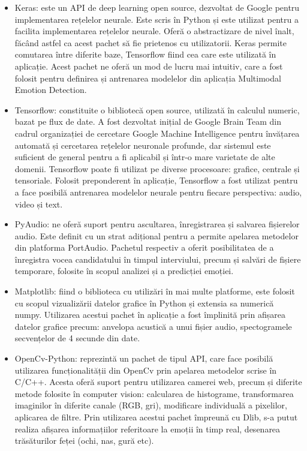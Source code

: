 \documentclass[a4paper, 12pt]{report}
\begin{document}
	\begin{itemize}
	 	\item Keras: este un API de deep learning open source, dezvoltat de Google pentru implementarea rețelelor neurale. Este scris în Python și este utilizat pentru a facilita implementarea rețelelor neurale. Oferă o abstractizare de nivel înalt, făcând astfel ca acest pachet să fie prietenos cu utilizatorii. Keras permite comutarea între diferite baze, Tensorflow fiind cea care este utilizată în aplicație. Acest pachet ne oferă un mod de lucru mai intuitiv, care a fost folosit pentru definirea și antrenarea modelelor din aplicația Multimodal Emotion Detection.
	
		\item Tensorflow: constituite o bibliotecă open source, utilizată în calculul numeric, bazat pe flux de date. A fost dezvoltat inițial de Google Brain Team din cadrul organizației de cercetare Google Machine Intelligence pentru învățarea automată și cercetarea rețelelor neuronale profunde, dar sistemul este suficient de general pentru a fi aplicabil și într-o mare varietate de alte domenii. Tensorflow poate fi utilizat pe diverse procesoare: grafice, centrale și tensoriale. Folosit preponderent în aplicație, Tensorflow a fost utilizat pentru a face posibilă antrenarea modelelor neurale pentru fiecare perspectiva: audio, video și text.
	
		\item PyAudio: ne oferă suport pentru ascultarea, înregistrarea și salvarea fișierelor audio. Este definit cu un strat adițional pentru a permite apelarea metodelor din platforma PortAudio. Pachetul respectiv a oferit posibilitatea de a înregistra vocea candidatului în timpul interviului, precum și salvări de fișiere temporare, folosite în scopul analizei și a predicției emoției.
	
		\item Matplotlib: fiind o biblioteca cu utilizări în mai multe platforme, este folosit cu scopul vizualizării datelor grafice în Python și extensia sa numerică numpy. Utilizarea acestui pachet în aplicație a fost împlinită prin afișarea datelor grafice precum: anvelopa acustică a unui fișier audio, spectogramele secvențelor de 4 secunde din date.
	
		\item OpenCv-Python: reprezintă un pachet de tipul API, care face posibilă utilizarea funcționalității din OpenCv prin apelarea metodelor scrise în C/C++. Acesta oferă suport pentru utilizarea camerei web, precum și diferite metode folosite în computer vision: calcularea de histograme, transformarea imaginilor în diferite canale (RGB, gri), modificare individuală a pixelilor, aplicarea de filtre. Prin utilizarea acestui pachet împreună cu Dlib, s-a putut realiza afișarea informațiilor referitoare la emoții în timp real, desenarea trăsăturilor feței (ochi, nas, gură etc).
	

\end{itemize}
\end{document}
